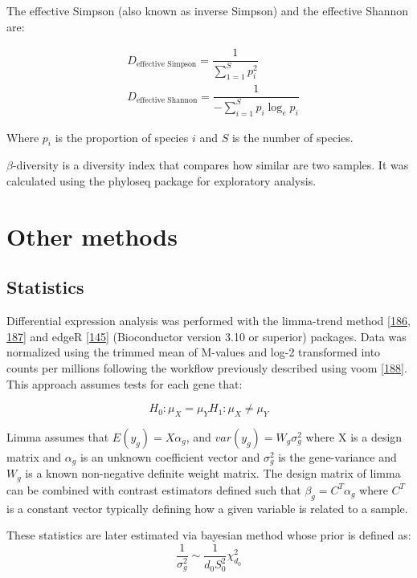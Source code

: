 \documentclass[
  12pt,
  a4paper,
  twoside,
  openright]{book}
\begin{document}
The effective Simpson (also known as inverse Simpson) and the effective Shannon are:

\[
\begin{aligned}
& D_{\text{effective Simpson}} = \dfrac{1}{\sum_{1=1}^Sp_i^2} \\
& D_{\text{effective Shannon}} = \dfrac{1}{-\sum_{i =1}^S p_i \log_e{p_i}}
\end{aligned}
\]

Where \(p_i\) is the proportion of species \(i\) and \(S\) is the number of species.

\(\beta\)-diversity is a diversity index that compares how similar are two samples.
It was calculated using the phyloseq package for exploratory analysis.

\hypertarget{other-methods}{%
\section{Other methods}\label{other-methods}}

\hypertarget{statistics}{%
\subsection{Statistics}\label{statistics}}

Differential expression analysis was performed with the limma-trend method {[}\protect\hyperlink{ref-ritchie2015}{186}, \protect\hyperlink{ref-law2014}{187}{]} and edgeR {[}\protect\hyperlink{ref-mccarthy2012}{145}{]} (Bioconductor version 3.10 or superior) packages.
Data was normalized using the trimmed mean of M-values and log-2 transformed into counts per millions following the workflow previously described using voom {[}\protect\hyperlink{ref-law2018}{188}{]}.
This approach assumes tests for each gene that:

\[
H_0 : \mu_{X} = \mu_{Y}
H_1 : \mu_{X} \neq \mu_{Y}
\]

Limma assumes that \(E(y_g) = X \alpha_g\), and \(var(y_g) = W_g \sigma_g^2\) where X is a design matrix and \(\alpha_g\) is an unknown coefficient vector and \(\sigma_g^2\) is the gene-variance and \(W_g\) is a known non-negative definite weight matrix.
The design matrix of limma can be combined with contrast estimators defined such that \(\beta_g = C^T \alpha_g\) where \(C^T\) is a constant vector typically defining how a given variable is related to a sample.

These statistics are later estimated via bayesian method whose prior is defined as:
\[
\dfrac{1}{\sigma_g^2} \sim \dfrac{1}{d_0 S_0^2} \chi_{d_0}^2
\]
\end{document}
